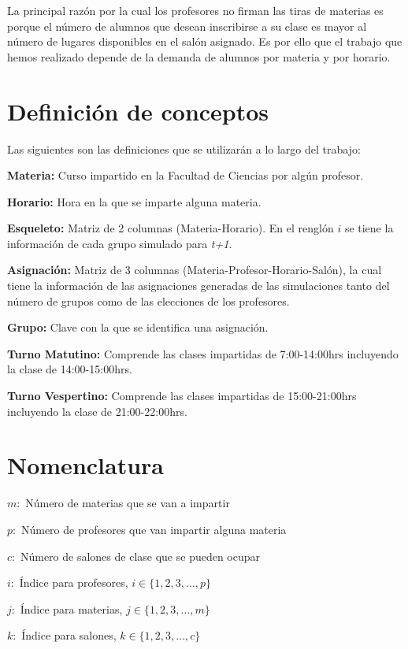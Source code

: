 La principal razón por la cual los profesores no firman las tiras de materias es porque el número de alumnos que desean inscribirse a su clase es mayor al número de lugares disponibles en el salón asignado. Es por ello que el trabajo que hemos realizado depende de la demanda de alumnos por materia y por horario.



\section{Definición de conceptos}

Las siguientes son las definiciones que se utilizarán a lo largo del trabajo:

\textbf{Materia:} Curso impartido en la Facultad de Ciencias por algún profesor.

\textbf{Horario:} Hora en la que se imparte alguna materia.

\textbf{Esqueleto:} Matriz de 2 columnas (Materia-Horario). En el renglón $i$ se tiene la información de cada grupo simulado para \textit{t+1}.

\textbf{Asignación:} Matriz de 3 columnas (Materia-Profesor-Horario-Salón), la cual tiene la información de las asignaciones generadas de las simulaciones tanto del número de grupos como de las elecciones de los profesores.

\textbf{Grupo:} Clave con la que se identifica una asignación.

\textbf{Turno Matutino:} Comprende las clases impartidas de 7:00-14:00hrs incluyendo la clase de 14:00-15:00hrs.

\textbf{Turno Vespertino:} Comprende las clases impartidas de 15:00-21:00hrs incluyendo la clase de 21:00-22:00hrs.


\section{Nomenclatura}

$m:$ Número de materias que se van a impartir

$p:$ Número de profesores que van impartir alguna materia

$c:$ Número de salones de clase que se pueden ocupar

$i:$ Índice para profesores, $i \in \{ 1, 2, 3, \ldots, p \}$

$j:$ Índice para materias, $j \in \{ 1, 2, 3, \ldots, m \}$

$k:$ Índice para salones, $k \in \{ 1, 2, 3, \ldots, c \}$

